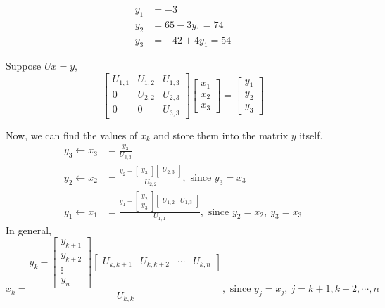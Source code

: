 	\begin{align*}
		y_1 & = -3\\
		y_2 & = 65-3y_1 = 74 \\
		y_3 & = -42 + 4y_1 = 54 
	\end{align*}
\begin{commentary}
	Suppose $Ux = y$,
	\[ \begin{bmatrix} U_{1,1} & U_{1,2} & U_{1,3} \\ 0 & U_{2,2} & U_{2,3} \\ 0 & 0 & U_{3,3} \end{bmatrix} \begin{bmatrix} x_1 \\ x_2 \\ x_3 \end{bmatrix} = \begin{bmatrix}y_1 \\ y_2 \\ y_3 \end{bmatrix} \]

	Now, we can find the values of $x_k$ and store them into the matrix $y$ itself.
	\begin{align*}
		y_3 \leftarrow x_3 & = \frac{y_3}{U_{3,3}} \\
		y_2 \leftarrow x_2 & = \frac{y_2 - \begin{bmatrix} y_3 \end{bmatrix} \begin{bmatrix} U_{2,3} \end{bmatrix}}{U_{2,2}},\text{ since } y_3 = x_3\\
		y_1 \leftarrow x_1 & = \frac{y_1 - \begin{bmatrix} y_2 \\ y_3 \end{bmatrix} \begin{bmatrix} U_{1,2} & U_{1,3} \end{bmatrix}}{U_{1,1}},\text{ since } y_2 = x_2,\ y_3 = x_3
	\end{align*}
	In general,
	\[ x_k = \frac{y_k - \begin{bmatrix} y_{k+1} \\ y_{k+2} \\ \vdots \\ y_n \end{bmatrix} \begin{bmatrix} U_{k,k+1} & U_{k,k+2} & \cdots & U_{k,n} \end{bmatrix}}{U_{k,k}},\text{ since } y_j = x_j,\ j = k+1,k+2,\cdots,n \]
\end{commentary}
